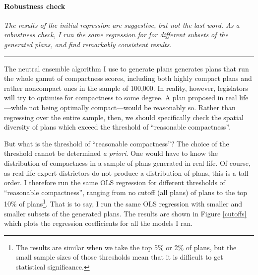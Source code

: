 \documentclass[]{article}
\let\oldparagraph\paragraph
\renewcommand{\paragraph}[1]{\oldparagraph{#1}\mbox{}}
\begin{document}
\hypertarget{robustness-check-1}{%
\paragraph{Robustness check}\label{robustness-check-1}}

\textsl{The results of the initial regression are suggestive, but not the last word. As
a robustness check, I run the same regression for for different subsets of the
generated plans, and find remarkably consistent results.}

\begin{center}\rule{0.5\linewidth}{\linethickness}\end{center}

The neutral ensemble algorithm I use to generate plans generates plans
that run the whole gamut of compactness scores, including both highly
compact plans and rather noncompact ones in the sample of 100,000. In
reality, however, legislators will try to optimise for compactness to
some degree. A plan proposed in real life---while not being optimally
compact---would be reasonably so. Rather than regressing over the entire
sample, then, we should specifically check the spatial diversity of
plans which exceed the threshold of ``reasonable compactness''.

But what is the threshold of ``reasonable compactness''? The choice of
the threshold cannot be determined \emph{a priori}. One would have to
know the distribution of compactness in a sample of plans generated in
real life. Of course, as real-life expert districtors do not produce a
distribution of plans, this is a tall order. I therefore run the same
OLS regression for different thresholds of ``reasonable compactness'',
ranging from no cutoff (all plans) of plans to the top 10\% of
plans\footnote{The results are similar when we take the top 5\% or 2\%
  of plans, but the small sample sizes of those thresholds mean that it
  is difficult to get statistical significance.}. That is to say, I run
the same OLS regression with smaller and smaller subsets of the
generated plans. The results are shown in Figure \ref{cutoffs} which
plots the regression coefficients for all the models I ran.
\end{document}
